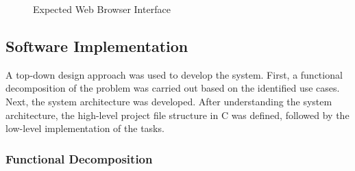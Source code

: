 \documentclass[12pt]{article} %
\begin{document}
\begin{itemize}
		\begin{figure}[h]
			\centering
			\caption{Expected Web Browser Interface}
			\label{fig:web_UI}
		\end{figure}
\end{itemize}

    \subsection{Software Implementation}

    A top-down design approach was used to develop the system. First, a functional
    decomposition of the problem was carried out based on the identified use cases.
    Next, the system architecture was developed. After understanding the system
    architecture, the high-level project file structure in C was defined, followed
    by the low-level implementation of the tasks.

    \subsubsection{Functional Decomposition}

\end{document}
